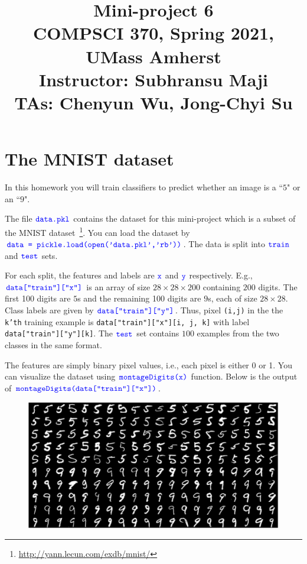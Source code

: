 \documentclass[10pt,letterpaper]{article}
\title{
	Mini-project 6\\
	\Large{COMPSCI 370, Spring 2021, UMass Amherst} \\
	\Large{Instructor: Subhransu Maji} \\
	\Large{TAs: Chenyun Wu, Jong-Chyi Su}
}
\date{}
\newcommand{\cmd}[1] {{\color{blue}\texttt{#1}}}
\begin{document}
	
\maketitle

\renewcommand\thesubsection{\thesection.\alph{subsection}}



\newpage

\section*{The MNIST dataset}
In this homework you will train classifiers to predict whether an
image is a ``$5$" or an ``$9$".

The file $\cmd{data.pkl}$ contains the dataset for this mini-project
which is a subset of the MNIST dataset~\footnote{\url{http://yann.lecun.com/exdb/mnist/}}.
You can load the dataset by $\cmd{data = pickle.load(open('data.pkl','rb'))}$. The data is split into $\cmd{train}$
and $\cmd{test}$ sets.


For each split, the features and labels are $\cmd{x}$ and $\cmd{y}$
respectively. E.g., $\cmd{data["train"]["x"]}$ is an array of size $28
\times 28 \times200$ containing $200$ digits.
The first 100 digits are ${5}$s and the remaining 100 digits are ${9}$s, each of size
$28 \times 28$.
Class labels are given by $\cmd{data["train"]["y"]}$. Thus, pixel
\cmd{(i,j)} in the the \cmd{k'th} training example is
\cmd{data["train"]["x"][i, j, k]} with label
\cmd{data["train"]["y"][k]}. The $\cmd{test}$ set contains $100$
examples from the two classes in the same format.


The features are simply binary pixel values, i.e., each pixel is
either 0 or 1. You can visualize the dataset using
$\cmd{montageDigits(x)}$ function. Below is the output of
$\cmd{montageDigits(data["train"]["x"])}$.

\begin{figure}[h]
\centering
\includegraphics[width=0.85\linewidth]{montage59.png}
\end{figure}
\end{document}
